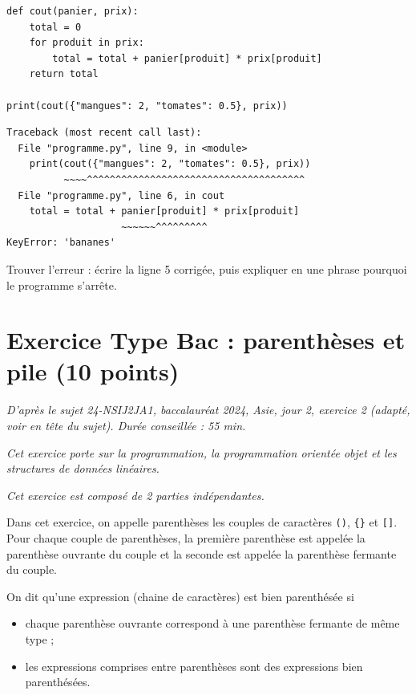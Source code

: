 \documentclass[a4paper, noanswers, addpoints, 12pt]{exam}
\begin{document}
\begin{questions}
\begin{minipage}{\linewidth}
\begin{lstlisting}[basicstyle=\ttfamily\footnotesize]
def cout(panier, prix):
    total = 0
    for produit in prix:
        total = total + panier[produit] * prix[produit]
    return total

print(cout({"mangues": 2, "tomates": 0.5}, prix))
\end{lstlisting}
\begin{lstlisting}[style=console]
Traceback (most recent call last):
  File "programme.py", line 9, in <module>
    print(cout({"mangues": 2, "tomates": 0.5}, prix))
          ~~~~^^^^^^^^^^^^^^^^^^^^^^^^^^^^^^^^^^^^^^
  File "programme.py", line 6, in cout
    total = total + panier[produit] * prix[produit]
                    ~~~~~~^^^^^^^^^
KeyError: 'bananes'
\end{lstlisting}
\end{minipage}\par

\question[1] Trouver l'erreur : écrire la ligne 5 corrigée, puis expliquer en une phrase pourquoi le programme s'arrête.

\needspace{20\baselineskip}
\section{Exercice Type Bac : parenthèses et pile (10 points)}
\begin{center}
\textit{D'après le sujet 24-NSIJ2JA1, baccalauréat 2024, Asie, jour 2, exercice 2 (adapté, voir en tête du sujet). Durée conseillée : 55 min.}
\end{center}

\textit{Cet exercice porte sur la programmation, la programmation orientée objet et les structures de données linéaires.}

\textit{Cet exercice est composé de 2 parties indépendantes.}

Dans cet exercice, on appelle parenthèses les couples de caractères \texttt{()}, \texttt{\{\}} et \texttt{[]}. Pour chaque couple de parenthèses, la première parenthèse est appelée la parenthèse ouvrante du couple et la seconde est appelée la parenthèse fermante du couple.

On dit qu'une expression (chaine de caractères) est bien parenthésée si
\begin{itemize}
\item chaque parenthèse ouvrante correspond à une parenthèse fermante de même type ;
\item les expressions comprises entre parenthèses sont des expressions bien parenthésées.
\end{itemize}


\end{questions}
\end{document}
